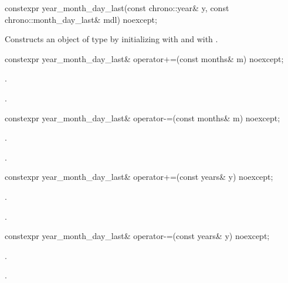 %
\begin{itemdecl}
constexpr year_month_day_last(const chrono::year& y,
                              const chrono::month_day_last& mdl) noexcept;
\end{itemdecl}

\begin{itemdescr}
\pnum
\effects
Constructs an object of type  by
initializing  with  and  with .
\end{itemdescr}

%
\begin{itemdecl}
constexpr year_month_day_last& operator+=(const months& m) noexcept;
\end{itemdecl}

\begin{itemdescr}
\pnum
\effects {}.

\pnum
\returns {}.
\end{itemdescr}

%
\begin{itemdecl}
constexpr year_month_day_last& operator-=(const months& m) noexcept;
\end{itemdecl}

\begin{itemdescr}
\pnum
\effects {}.

\pnum
\returns {}.
\end{itemdescr}

%
\begin{itemdecl}
constexpr year_month_day_last& operator+=(const years& y) noexcept;
\end{itemdecl}

\begin{itemdescr}
\pnum
\effects {}.

\pnum
\returns {}.
\end{itemdescr}

%
\begin{itemdecl}
constexpr year_month_day_last& operator-=(const years& y) noexcept;
\end{itemdecl}

\begin{itemdescr}
\pnum
\effects {}.

\pnum
\returns {}.
\end{itemdescr}

